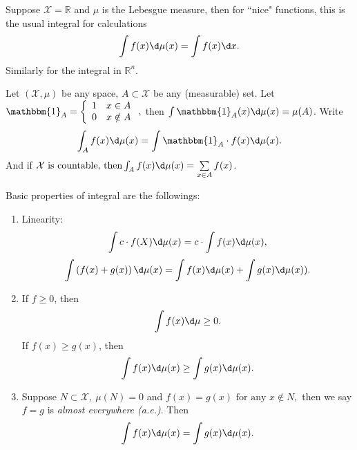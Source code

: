 \documentclass[a4paper]{article}
\begin{document}
\begin{eg}
	Suppose $\mathcal{X}=\mathbb{R}$ and $\mu$ is the Lebesgue measure, then for ``nice" functions, this is the usual integral for calculations
	\begin{equation}
		\int f(x) \d \mu (x) = \int f(x) \d x.
	\end{equation}
	Similarly for the integral in $\mathbb{R}^n.$
\end{eg}

\begin{eg}
	Let $(\mathcal{X}, \mu)$ be any space, $A \subset \mathcal{X}$ be any (measurable) set. Let $\mathbbm{1}_A = \left\{
	\begin{array}{ll}
		1 & x \in A \\
		0 & x  \notin A
	\end{array}
	\right.,$ then $\int \mathbbm{1}_A (x) \d \mu (x) = \mu (A)$. Write
	\begin{equation}
		\int_A f(x) \d \mu (x) = \int \mathbbm{1}_A \cdot f(x) \d \mu (x).
	\end{equation}
	And if $\mathcal{X} \text{ is countable, then} \int_A f(x) \d \mu (x) = \sum\limits_{x \in A} f(x)$.
\end{eg}

\newpage
\begin{prop} Basic properties of integral are the followings: 
		\begin{enumerate}
			\item Linearity: 
			\begin{equation}
				\int c \cdot f(X) \d \mu (x) = c \cdot \int f(x) \d \mu (x),
			\end{equation}
			\begin{equation}
				\int \left(f(x) + g(x)\right) \d \mu (x) = \int f(x) \d \mu (x) + \int g(x) \d \mu (x)).
			\end{equation}
			\item If $f \geq 0$, then
			\begin{equation}
				\int f(x) \d \mu \geq 0.
			\end{equation}
			If $f (x) \geq g(x)$, then
			\begin{equation}
				\int f(x) \d \mu (x) \geq \int g(x) \d \mu (x).
			\end{equation}
			\item Suppose $N \subset \mathcal{X},\ \mu (N) = 0$ and $f(x) = g(x) \text{ for any } x \notin N,$ then we say $f = g$ is \emph{almost everywhere (a.e.)}. Then 
			\begin{equation}
				\int f(x) \d \mu (x) = \int g(x) \d \mu (x).
			\end{equation}
		\end{enumerate}
\end{prop}
\end{document}
